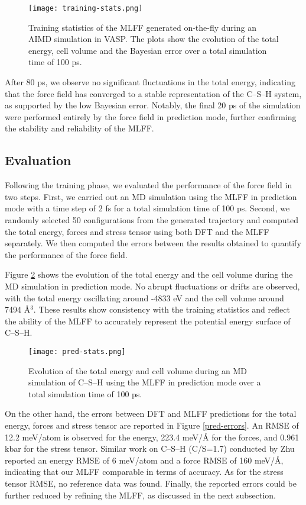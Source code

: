 \begin{figure}[H]
    \centering
    \texttt{[image: training-stats.png]}
    \caption{
    Training statistics of the MLFF generated on-the-fly during an AIMD simulation in VASP. The plots show the evolution of the total energy, cell volume and the Bayesian error over a total simulation time of 100 ps. 
    }
    \label{training-stats}
\end{figure}

After 80 ps, we observe no significant fluctuations in the total energy, indicating that the force field has converged to a stable representation of the C--S--H system, as supported by the low Bayesian error. Notably, the final 20 ps of the simulation were performed entirely by the force field in prediction mode, further confirming the stability and reliability of the MLFF.

\subsection{Evaluation}
Following the training phase, we evaluated the performance of the force field in two steps. First, we carried out an MD simulation using the MLFF in prediction mode with a time step of 2 fs for a total simulation time of 100 ps. Second, we randomly selected 50 configurations from the generated trajectory and computed the total energy, forces and stress tensor using both DFT and the MLFF separately. We then computed the errors between the results obtained to quantify the performance of the force field. 

Figure \ref{pred-stats} shows the evolution of the total energy and the cell volume during the MD simulation in prediction mode. No abrupt fluctuations or drifts are observed, with the total energy oscillating around -4833 eV and the cell volume around 7494 \AA$^3$. These results show consistency with the training statistics and reflect the ability of the MLFF to accurately represent the potential energy surface of C--S--H.

\begin{figure}[h!]
    \centering
    \texttt{[image: pred-stats.png]}
    \caption{
    Evolution of the total energy and cell volume during an MD simulation of C--S--H using the MLFF in prediction mode over a total simulation time of 100 ps.  
    }
    \label{pred-stats}
\end{figure}

On the other hand, the errors between DFT and MLFF predictions for the total energy, forces and stress tensor are reported in Figure \ref{pred-errors}. An RMSE of 12.2 meV/atom is observed for the energy, 223.4 meV/Å for the forces, and 0.961 kbar for the stress tensor. Similar work on C--S--H (C/S=1.7) conducted by Zhu  \cite{Zhu2024} reported an energy RMSE of 6 meV/atom and a force RMSE of 160 meV/Å, indicating that our MLFF comparable in terms of accuracy. As for the stress tensor RMSE, no reference data was found. Finally, the reported errors could be further reduced by refining the MLFF, as discussed in the next subsection.

